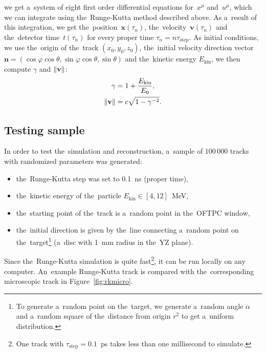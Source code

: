 		we get a~system of eight first order differential equations for~$x^\mu$ and~$u^\mu$, which we can integrate using the~Runge-Kutta method described above. As a~result of this integration, we get the~position~$\mathbf{x}(\tau_n)$, the~velocity~$\mathbf{v}(\tau_n)$ and the~detector time~$t(\tau_n)$ for every proper time $\tau_n = n \tau_\text{step}$. As initial conditions, we use the~origin of the~track $(x_0,y_0,z_0)$, the~initial velocity direction vector $\mathbf{n} = (\cos\varphi\cos\theta,\sin\varphi\cos\theta,\sin\theta)$ and the~kinetic energy $E_\text{kin}$, we then compute $\gamma$ and $\norm{\mathbf{v}}$:
			\begin{align}
				\gamma &= 1 + \frac{E_\text{kin}}{E_0},\\
				\norm{\mathbf{v}} &= c\sqrt{1-\gamma^{-2}}.
			\end{align}
			
		\subsection{Testing sample}
		\label{sec:rktest}
		
		In order to test the~simulation and reconstruction, a~sample of $100\,000$ tracks with randomized parameters was generated:
			\begin{itemize}[topsep=4pt,itemsep=2pt]
				\item the~Runge-Kutta step was set to 0.1~ns (proper time),
				\item the~kinetic energy of the~particle $E_\text{kin} \in [4,12]$~MeV,
				\item the~starting point of the~track is a~random point in the~\ac{OFTPC} window,
				\item the~initial direction is given by the~line connecting a~random point on the~target\footnote{To generate a~random point on the~target, we generate a~random angle $\alpha$ and a~random square of the~distance from origin $r^2$ to get a~uniform distribution.} (a~disc with 1~mm radius in the~YZ plane).
			\end{itemize}
		Since the~Runge-Kutta simulation is quite fast\footnote{One track with $\tau_\text{step} = 0.1$~ps takes less than one millisecond to simulate.}, it can be run locally on any computer. An~example Runge-Kutta track is compared with the~corresponding microscopic track in Figure~\ref{fig:rkmicro}.
		
